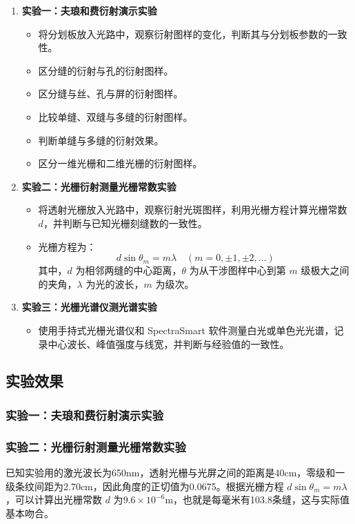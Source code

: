 \documentclass[zihao=5, UTF8]{article}
\theoremstyle{MyLineTheoremStyle} %
\theoremstyle{MyBlockTheoremStyle} %
\theoremstyle{MySubsubsectionStyle} %
\begin{document}
\begin{enumerate}
    \item \textbf{实验一：夫琅和费衍射演示实验}
    \begin{itemize}
        \item 将分划板放入光路中，观察衍射图样的变化，判断其与分划板参数的一致性。
        \item 区分缝的衍射与孔的衍射图样。
        \item 区分缝与丝、孔与屏的衍射图样。
        \item 比较单缝、双缝与多缝的衍射图样。
        \item 判断单缝与多缝的衍射效果。
        \item 区分一维光栅和二维光栅的衍射图样。
    \end{itemize}

    \item \textbf{实验二：光栅衍射测量光栅常数实验}
    \begin{itemize}
        \item 将透射光栅放入光路中，观察衍射光斑图样，利用光栅方程计算光栅常数 \(d\)，并判断与已知光栅刻缝数的一致性。
        \item 光栅方程为：
        \[
        d \sin \theta_m = m \lambda \quad (m = 0, \pm 1, \pm 2, \ldots)
        \]
        其中，\(d\) 为相邻两缝的中心距离，\(\theta\) 为从干涉图样中心到第 \(m\) 级极大之间的夹角，\(\lambda\) 为光的波长，\(m\) 为级次。
    \end{itemize}

    \item \textbf{实验三：光栅光谱仪测光谱实验}
    \begin{itemize}
        \item 使用手持式光栅光谱仪和 SpectraSmart 软件测量白光或单色光光谱，记录中心波长、峰值强度与线宽，并判断与经验值的一致性。
    \end{itemize}
\end{enumerate}

\subsection{实验效果}

\subsubsection{实验一：夫琅和费衍射演示实验}

\subsubsection{实验二：光栅衍射测量光栅常数实验}

已知实验用的激光波长为650nm，透射光栅与光屏之间的距离是40cm，零级和一级条纹间距为2.70cm，因此角度的正切值为0.0675。根据光栅方程 \(d \sin \theta_m = m \lambda\)，可以计算出光栅常数 \(d\) 为$9.6\times10^{-6}$m，也就是每毫米有103.8条缝，这与实际值基本吻合。
\end{document}
